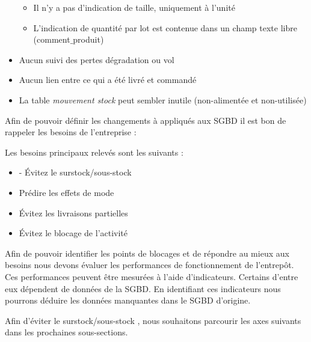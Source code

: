 \begin{itemize}
\begin{itemize}
\begin{itemize}
			\end{itemize}
		

			\item Il n’y a pas d’indication de taille, uniquement à l’unité 

			\item L’indication de quantité par lot est contenue dans un champ texte libre (comment$\_$produit) 	
		\end{itemize}	
	
	\item Aucun suivi des pertes dégradation ou vol 

	\item Aucun lien entre ce qui a été livré et commandé 

	\item La table \textit{mouvement stock} peut sembler inutile (non-alimentée et non-utilisée)
	
\end{itemize}	

\vertspace 
	
Afin de pouvoir définir les changements à appliqués aux SGBD il est bon de rappeler les besoins de l’entreprise :   

Les besoins principaux relevés sont les suivants :

\begin{itemize}

	\item - Évitez le surstock/sous-stock 

	\item Prédire les effets de mode 

	\item Évitez les livraisons partielles 

   \item Évitez le blocage de l’activité 

\end{itemize}  

\vertspace


	
Afin de pouvoir identifier les points de blocages et de répondre au mieux aux besoins nous devons évaluer les performances de fonctionnement de l’entrepôt. Ces performances peuvent être mesurées à l’aide d’indicateurs. Certains d'entre eux dépendent de données de la SGBD. En identifiant ces indicateurs nous pourrons déduire les données manquantes dans le SGBD d'origine. 

\vertspace 

Afin d’éviter le surstock/sous-stock , nous souhaitons parcourir les axes suivants dans les prochaines sous-sections.  	  

